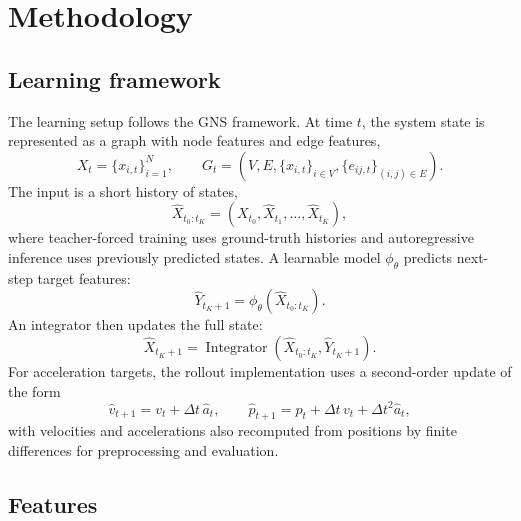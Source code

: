 \documentclass[11pt,a4paper,reqno]{amsart}
\theoremstyle{definition}
\theoremstyle{remark}
\numberwithin{equation}{section}
\newcommand{\Integrator}{\operatorname{Integrator}}
\begin{document}
\section{Methodology}
\label{sec:methodology}

\subsection{Learning framework}

The learning setup follows the GNS framework. At time $t$, the system state is represented as a graph with node features and edge features,
\begin{equation}
    X_t = \{x_{i,t}\}_{i=1}^N,
    \qquad
    G_t=(V,E,\{x_{i,t}\}_{i\in V},\{e_{ij,t}\}_{(i,j)\in E}).
\end{equation}
The input is a short history of states,
\begin{equation}
    \hat X_{t_0:t_K} = (X_{t_0},\hat X_{t_1},\ldots,\hat X_{t_K}),
\end{equation}
where teacher-forced training uses ground-truth histories and autoregressive inference uses previously predicted states. A learnable model $\phi_\theta$ predicts next-step target features:
\begin{equation}
    \hat Y_{t_K+1}=\phi_\theta(\hat X_{t_0:t_K}).
\end{equation}
An integrator then updates the full state:
\begin{equation}
    \hat X_{t_K+1}=\Integrator(\hat X_{t_0:t_K},\hat Y_{t_K+1}).
    \label{eq:simulator}
\end{equation}
For acceleration targets, the rollout implementation uses a second-order update of the form
\begin{equation}
    \hat v_{t+1}=v_t+\Delta t\,\hat a_t,
    \qquad
    \hat p_{t+1}=p_t+\Delta t\,v_t+\Delta t^2\hat a_t,
    \label{eq:rollout-integrator}
\end{equation}
with velocities and accelerations also recomputed from positions by finite differences for preprocessing and evaluation.

\subsection{Features}
\end{document}
